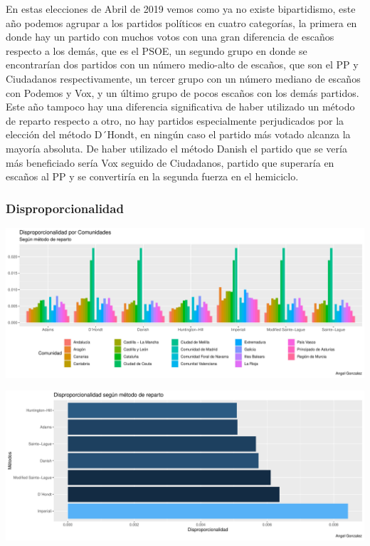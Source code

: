 \documentclass[12pt,a4paper,]{book}
\numberwithin{dummy}{section}
\theoremstyle{ocrenumbox}
\theoremstyle{blacknumex}
\theoremstyle{blacknumbox}
\theoremstyle{ocrenum}
\theoremstyle{ocrenum}
\begin{document}
En estas elecciones de Abril de 2019 vemos como ya no existe
bipartidismo, este año podemos agrupar a los partidos políticos en
cuatro categorías, la primera en donde hay un partido con muchos votos
con una gran diferencia de escaños respecto a los demás, que es el PSOE,
un segundo grupo en donde se encontrarían dos partidos con un número
medio-alto de escaños, que son el PP y Ciudadanos respectivamente, un
tercer grupo con un número mediano de escaños con Podemos y Vox, y un
último grupo de pocos escaños con los demás partidos. Este año tampoco
hay una diferencia significativa de haber utilizado un método de reparto
respecto a otro, no hay partidos especialmente perjudicados por la
elección del método D´Hondt, en ningún caso el partido más votado
alcanza la mayoría absoluta. De haber utilizado el método Danish el
partido que se vería más beneficiado sería Vox seguido de Ciudadanos,
partido que superaría en escaños al PP y se convertiría en la segunda
fuerza en el hemiciclo.

\hypertarget{disproporcionalidad-12}{%
\subsubsection{Disproporcionalidad}\label{disproporcionalidad-12}}

\begin{center}\includegraphics[width=0.95\linewidth]{figurasR/unnamed-chunk-177-1} \end{center}

\begin{center}\includegraphics[width=0.95\linewidth]{figurasR/unnamed-chunk-177-2} \end{center}
\end{document}
